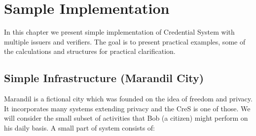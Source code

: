 \chapter{Sample Implementation}
\thispagestyle{chapterBeginStyle}

In this chapter we present simple implementation of Credential System with multiple issuers and verifiers. The goal is to present practical examples, some of the calculations and structures for practical clarification.

\section{Simple Infrastructure (Marandil City)}
Marandil is a fictional city which was founded on the idea of freedom and privacy. It incorporates many systems extending privacy and the CreS is one of those. We will consider the small subset of activities that Bob (a citizen) might perform on his daily basis. A small part of system consists of: 

